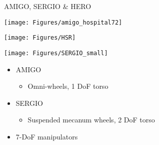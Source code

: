 \documentclass[12pt,a4paper]{article}
\newcommand{\emptylogo}{\texttt{[image: Figures/Empty]}}
\begin{document}
\begin{slidetop}


\begin{multicols}{2}

\begin{bclogo}[couleur = white, arrondi = 0.25, couleurBord = tuedarkblue , barre = none, logo=\emptylogo]{\textcolor{tuedarkblue}{AMIGO, SERGIO \& HERO}}
\medskip %
\begin{minipage}[T]{0.35\linewidth}
	\begin{center}
		\texttt{[image: Figures/amigo\_hospital72]}
	\end{center}
\end{minipage}
\begin{minipage}[T]{0.35\linewidth}
    \begin{center}
    	\texttt{[image: Figures/HSR]}
    \end{center}
\end{minipage}
\begin{minipage}[T]{0.29\linewidth}
    \begin{center}
    	\texttt{[image: Figures/SERGIO\_small]}
    \end{center}
\end{minipage}
    \begin{itemize}[itemsep = 0pt, parsep = 0pt, leftmargin=15pt]
    	\item AMIGO
    	\begin{itemize}[itemsep = 0pt, parsep = 0pt, leftmargin=15pt]
    		\item Omni-wheels, 1 DoF torso
    	\end{itemize}
    	\item SERGIO
    	\begin{itemize}[itemsep = 0pt, parsep = 0pt, leftmargin=15pt]
    		\item Suspended mecanum wheels, 2 DoF torso
    	\end{itemize}
        \item 7-DoF manipulators
    \end{itemize}
\end{bclogo}


\end{multicols}
\end{slidetop}
\end{document}
